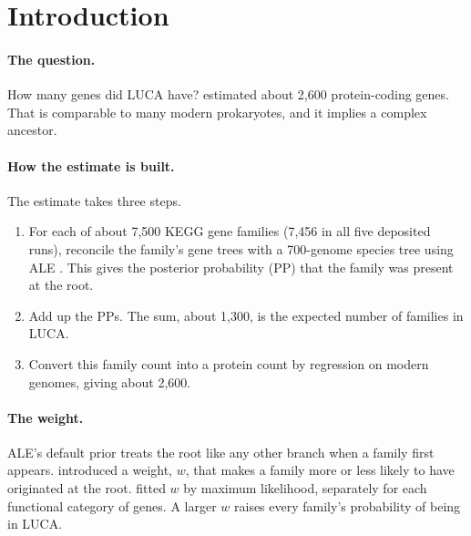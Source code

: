 \documentclass[11pt]{article}
\newcommand{\PP}{\mathrm{PP}}
\begin{document}
\section{Introduction}

\paragraph{The question.} How many genes did LUCA have? \citet{moody2024} estimated about 2,600 protein-coding genes. That is comparable to many modern prokaryotes, and it implies a complex ancestor.

\paragraph{How the estimate is built.} The estimate takes three steps.
\begin{enumerate}
  \item For each of about 7,500 KEGG gene families (7,456 in all five deposited runs), reconcile the family's gene trees with a 700-genome species tree using ALE \citep{szollosi2013}. This gives the posterior probability ($\PP$) that the family was present at the root.
  \item Add up the $\PP$s. The sum, about 1,300, is the expected number of families in LUCA.
  \item Convert this family count into a protein count by regression on modern genomes, giving about 2,600.
\end{enumerate}

\paragraph{The weight.} ALE's default prior treats the root like any other branch when a family first appears. \citet{coleman2021} introduced a weight, $w$, that makes a family more or less likely to have originated at the root. \citet{moody2024} fitted $w$ by maximum likelihood, separately for each functional category of genes. A larger $w$ raises every family's probability of being in LUCA.
\end{document}
